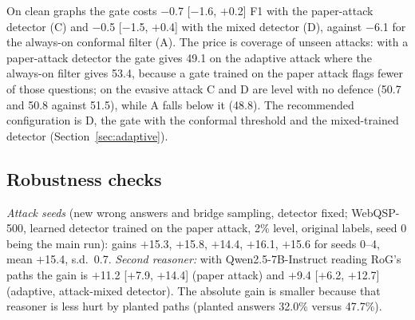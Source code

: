 \documentclass[preprint,12pt]{elsarticle}
\begin{document}
On clean graphs the gate costs $-$0.7 [$-$1.6, $+$0.2] F1 with the paper-attack detector (C) and $-$0.5 [$-$1.5, $+$0.4] with the mixed detector (D), against $-$6.1 for the always-on conformal filter (A). The price is coverage of unseen attacks: with a paper-attack detector the gate gives 49.1 on the adaptive attack where the always-on filter gives 53.4, because a gate trained on the paper attack flags fewer of those questions; on the evasive attack C and D are level with no defence (50.7 and 50.8 against 51.5), while A falls below it (48.8). The recommended configuration is D, the gate with the conformal threshold and the mixed-trained detector (Section~\ref{sec:adaptive}).

\subsection{Robustness checks}
\emph{Attack seeds} (new wrong answers and bridge sampling, detector fixed; WebQSP-500, learned detector trained on the paper attack, 2\% level, original labels, seed 0 being the main run): gains $+$15.3, $+$15.8, $+$14.4, $+$16.1, $+$15.6 for seeds 0--4, mean $+$15.4, s.d.\ 0.7. \emph{Second reasoner:} with Qwen2.5-7B-Instruct reading RoG's paths the gain is $+$11.2 [$+$7.9, $+$14.4] (paper attack) and $+$9.4 [$+$6.2, $+$12.7] (adaptive, attack-mixed detector). The absolute gain is smaller because that reasoner is less hurt by planted paths (planted answers 32.0\% versus 47.7\%).
\end{document}
